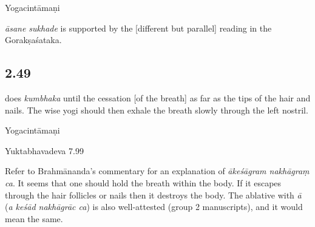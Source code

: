 \begin{ekdosis}
\begin{sources}[hp02_048]
\end{sources}

\begin{testimonia}[hp02_048]
Yogacintāmaṇi

\begin{versinnote}
\end{versinnote} 
\end{testimonia}

\begin{philcomm}[hp02_048]
\emph{āsane sukhade} is supported by the [different but parallel] reading in the Gorakṣa\-śataka.
\end{philcomm}

\subsection*{2.49}
\begin{translation} does \emph{kumbhaka} until the cessation [of the breath] as far as the tips of the hair and nails. The wise yogi should then exhale the breath slowly through the left nostril.
\end{translation}

\begin{sources}[hp02_049]
\end{sources}

\begin{testimonia}[hp02_049]
Yogacintāmaṇi 
\begin{versinnote} 
\end{versinnote}

Yuktabhavadeva 7.99

\begin{versinnote}
\end{versinnote}
\end{testimonia}

\begin{philcomm}[hp02_049]
Refer to Brahmānanda’s commentary for an explanation of \emph{ākeśāgram nakhāgraṃ ca}. It seems that one should hold the breath within the body. If it escapes through the hair follicles or nails then it destroys the body. The ablative with \emph{ā} (\emph{a keśād nakhāgrāc ca}) is also well-attested (group 2 manuscripts), and it would mean the same.


\end{philcomm}
\end{ekdosis}
